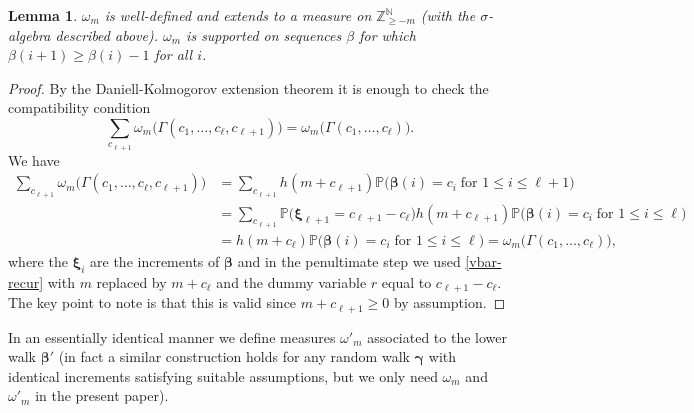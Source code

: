 \documentclass[11pt,reqno]{amsart}
\numberwithin{equation}{section}
\newtheorem{lemma}[theorem]{Lemma}
\theoremstyle{definition}
\theoremstyle{remark}
\newcommand{\mb}{\mathbb}
\def\boldbeta{\boldsymbol\beta}
\def\boldgamma{\boldsymbol\gamma}
\def\boldxi{\boldsymbol\xi}
\renewcommand{\le}{\leqslant}
\renewcommand{\ge}{\geqslant}
\newcommand\Z{\mathbb{Z}}
\newcommand\N{\mathbb{N}}
\begin{document}
\begin{lemma}\label{72lemma}
$\omega_m$ is well-defined and extends to a measure on $\Z^{\N}_{\ge -m}$ \textup{(}with the $\sigma$-algebra described above\textup{)}. $\omega_m$ is supported on sequences $\beta$ for which $\beta(i+1) \ge \beta(i) - 1$ for all $i$.
\end{lemma}
\begin{proof} By the Daniell-Kolmogorov extension theorem it is enough to check the compatibility condition 
\begin{equation*}\sum_{c_{\ell+1}} \omega_m \big( \Gamma(c_1,\dots, c_{\ell},c_{\ell+1})\big) = \omega_m \big( \Gamma(c_1,\dots, c_{\ell})\big).\end{equation*}
We have
\begin{align*}   \sum_{c_{\ell+1}} \omega_m \big( \Gamma(c_1,\dots, c_{\ell},c_{\ell+1})\big)  & = \sum_{c_{\ell+1}  }h(m + c_{\ell+1}) \mb{P}\big(\boldbeta(i) = c_i \; \mbox{for $1 \le i \le \ell+1$}\big) \\ & = \sum_{c_{\ell+1}  }\mb{P}\big(\boldxi_{\ell+1} = c_{\ell+1} - c_{\ell}\big)h(m + c_{\ell+1}) \mb{P}\big(\boldbeta(i) = c_i \; \mbox{for $1 \le i \le \ell$}\big) \\ & = h(m + c_{\ell}) \mb{P}\big(\boldbeta(i) = c_i \; \mbox{for $1 \le i \le \ell$}\big) = \omega_m \big( \Gamma(c_1,\dots, c_{\ell})\big), \end{align*}
where the $\boldxi_i$ are the increments of $\boldbeta$ and in the penultimate step we used \cref{vbar-recur} with $m$ replaced by $m + c_{\ell}$ and the dummy variable $r$ equal to $c_{\ell+1} - c_{\ell}$. The key point to note is that this is valid since $m + c_{\ell+1} \ge 0$ by assumption.
\end{proof}
In an essentially identical manner we define measures $\omega'_m$ associated to the lower walk $\boldbeta'$ (in fact a similar construction holds for any random walk $\boldgamma$ with identical increments satisfying suitable assumptions, but we only need $\omega_m$ and $\omega'_m$ in the present paper).
\end{document}
